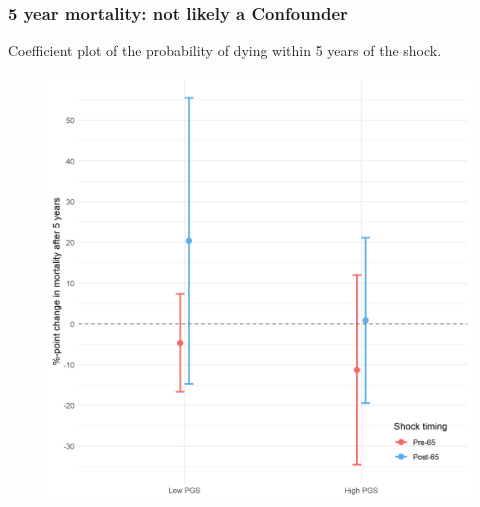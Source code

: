 \documentclass[10pt,compress,xcolor=dvipsnames,aspectratio=169]{beamer}    %
\newcounter{ex}
\newcommand{\1}[1]{\mathrm{1\hspace*{-2.5pt}l}[#1]}	%
\begin{document}
\begin{frame}
\frametitle{5 year mortality: not likely a Confounder}
Coefficient plot of the probability of dying within 5 years of the shock.
\begin{figure}[hbtp]
\centering
\includegraphics[height=0.8\textheight]{../../3_output/shock_effects/dead5_6070_100_cvplot.png}
\label{fig:dead5}
\end{figure}
\end{frame}





\end{document}

